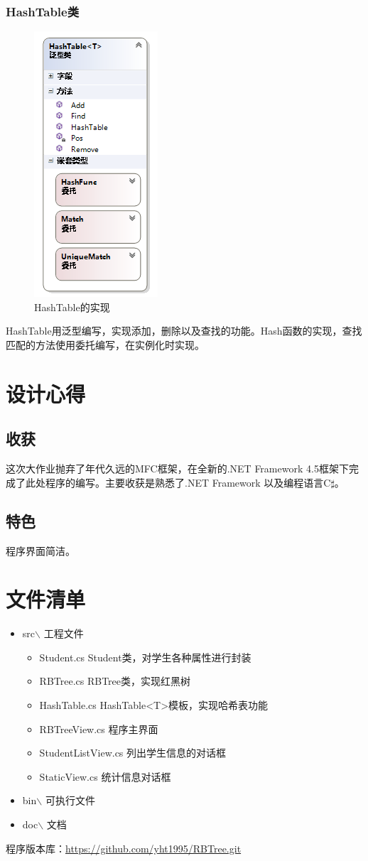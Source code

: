 \documentclass[12pt,a4paper]{article}
\begin{document}
\subsubsection{HashTable类}
\begin{figure}[H]
\centering
\includegraphics[scale = 1]{5.png}
\caption{HashTable的实现} 
\end{figure}
HashTable用泛型编写，实现添加，删除以及查找的功能。Hash函数的实现，查找匹配的方法使用委托编写，在实例化时实现。
\section{设计心得}
\subsection{收获}
这次大作业抛弃了年代久远的MFC框架，在全新的.NET Framework 4.5框架下完成了此处程序的编写。主要收获是熟悉了.NET Framework 以及编程语言C$\sharp$。
\subsection{特色}
程序界面简洁。
\section{文件清单}
\begin{itemize}
\item src$\backslash$ 工程文件
\begin{itemize}
\item Student.cs Student类，对学生各种属性进行封装
\item RBTree.cs RBTree类，实现红黑树
\item HashTable.cs HashTable<T>模板，实现哈希表功能
\item RBTreeView.cs 程序主界面
\item StudentListView.cs 列出学生信息的对话框
\item StaticView.cs 统计信息对话框
\end{itemize}
\item bin$\backslash$ 可执行文件
\item doc$\backslash$ 文档
\end{itemize}
程序版本库：\url{https://github.com/yht1995/RBTree.git}
\end{document}
